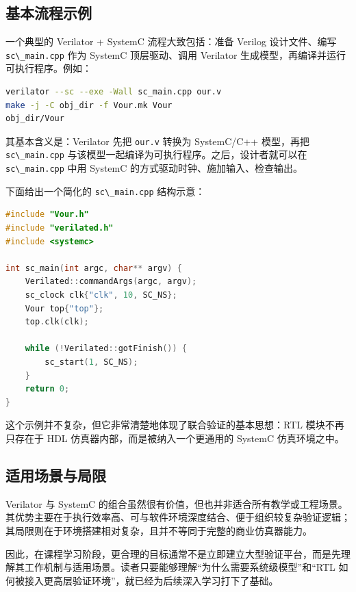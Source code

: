 \subsection{基本流程示例}\label{ux57faux672cux6d41ux7a0bux793aux4f8b}

一个典型的 Verilator + SystemC 流程大致包括：准备 Verilog 设计文件、编写
\passthrough{\lstinline!sc\_main.cpp!} 作为 SystemC 顶层驱动、调用
Verilator 生成模型，再编译并运行可执行程序。例如：

\begin{lstlisting}[language=bash]
verilator --sc --exe -Wall sc_main.cpp our.v
make -j -C obj_dir -f Vour.mk Vour
obj_dir/Vour
\end{lstlisting}

其基本含义是：Verilator 先把 \passthrough{\lstinline!our.v!} 转换为
SystemC/C++ 模型，再把 \passthrough{\lstinline!sc\_main.cpp!}
与该模型一起编译为可执行程序。之后，设计者就可以在
\passthrough{\lstinline!sc\_main.cpp!} 中用 SystemC
的方式驱动时钟、施加输入、检查输出。

下面给出一个简化的 \passthrough{\lstinline!sc\_main.cpp!} 结构示意：

\begin{lstlisting}[language={C++}]
#include "Vour.h"
#include "verilated.h"
#include <systemc>

int sc_main(int argc, char** argv) {
    Verilated::commandArgs(argc, argv);
    sc_clock clk{"clk", 10, SC_NS};
    Vour top{"top"};
    top.clk(clk);

    while (!Verilated::gotFinish()) {
        sc_start(1, SC_NS);
    }
    return 0;
}
\end{lstlisting}

这个示例并不复杂，但它非常清楚地体现了联合验证的基本思想：RTL
模块不再只存在于 HDL 仿真器内部，而是被纳入一个更通用的 SystemC
仿真环境之中。

\subsection{适用场景与局限}\label{ux9002ux7528ux573aux666fux4e0eux5c40ux9650}

Verilator 与 SystemC
的组合虽然很有价值，但也并非适合所有教学或工程场景。其优势主要在于执行效率高、可与软件环境深度结合、便于组织较复杂验证逻辑；其局限则在于环境搭建相对复杂，且并不等同于完整的商业仿真器能力。

因此，在课程学习阶段，更合理的目标通常不是立即建立大型验证平台，而是先理解其工作机制与适用场景。读者只要能够理解``为什么需要系统级模型''和``RTL
如何被接入更高层验证环境''，就已经为后续深入学习打下了基础。

